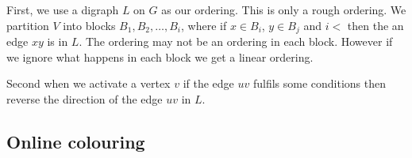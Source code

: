First, we use a digraph $L$ on $G$ as our ordering. This is only a rough ordering. We partition $V$ into blocks $B_1,B_2,\dots,B_i$, where if $x \in B_i$, $y \in B_j$ and $i <$ then the an edge $xy$ is in $L$. The ordering may not be an ordering in each block. However if we ignore what happens in each block we get a linear ordering.

Second when we activate a vertex $v$ if the edge $uv$ fulfils some conditions then reverse the direction of the edge $uv$ in $L$.

\subsection{Online colouring}

        


















